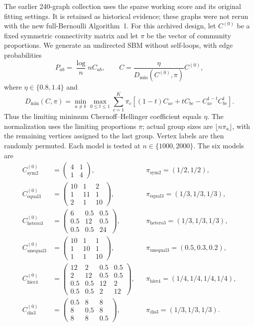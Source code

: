 \documentclass[11pt]{article}
\theoremstyle{definition}
\theoremstyle{remark}
\numberwithin{equation}{section}
\begin{document}
The earlier 240-graph collection uses the sparse working score and its original fitting settings. It is retained as historical evidence; these graphs were not rerun with the new full-Bernoulli Algorithm~1. For this archived design, let $C^{(0)}$ be a fixed symmetric connectivity matrix and
let $\pi$ be the vector of community proportions. We generate an undirected
SBM without self-loops, with edge probabilities
\begin{equation}
  P_{ab}=\frac\log n{n}C_{ab},\qquad
  C=\frac{\eta}{D_{\min}(C^{(0)},\pi)}C^{(0)},
  \label{eq:experiment_normalization}
\end{equation}
where $\eta\in\{0.8,1.4\}$ and
\begin{equation}
 D_{\min}(C,\pi)=\min_{a\ne b}\max_{0\le t\le1}
  \sum_{c=1}^K\pi_c\left[(1-t)C_{ac}+tC_{bc}
                          -C_{ac}^{1-t}C_{bc}^t\right].
\end{equation}
Thus the limiting minimum Chernoff--Hellinger coefficient equals $\eta$.
The normalization uses the limiting proportions $\pi$; actual group sizes
are $\lfloor n\pi_a\rfloor$, with the remaining vertices assigned to the
last group. Vertex labels are then randomly permuted. Each model is tested
at $n\in\{1000,2000\}$. The six models are
\begin{align*}
 C^{(0)}_{\mathrm{sym2}}&=
 \begin{pmatrix}4&1\\1&4\end{pmatrix},
 &&\pi_{\mathrm{sym2}}=(1/2,1/2),\\[2mm]
 C^{(0)}_{\mathrm{equal3}}&=
 \begin{pmatrix}10&1&2\\1&11&1\\2&1&10\end{pmatrix},
 &&\pi_{\mathrm{equal3}}=(1/3,1/3,1/3),\\[2mm]
 C^{(0)}_{\mathrm{hetero3}}&=
 \begin{pmatrix}6&0.5&0.5\\0.5&12&0.5\\0.5&0.5&24\end{pmatrix},
 &&\pi_{\mathrm{hetero3}}=(1/3,1/3,1/3),\\[2mm]
 C^{(0)}_{\mathrm{unequal3}}&=
 \begin{pmatrix}10&1&1\\1&10&1\\1&1&10\end{pmatrix},
 &&\pi_{\mathrm{unequal3}}=(0.5,0.3,0.2),\\[2mm]
 C^{(0)}_{\mathrm{hier4}}&=
 \begin{pmatrix}12&2&0.5&0.5\\2&12&0.5&0.5\\
                 0.5&0.5&12&2\\0.5&0.5&2&12\end{pmatrix},
 &&\pi_{\mathrm{hier4}}=(1/4,1/4,1/4,1/4),\\[2mm]
 C^{(0)}_{\mathrm{dis3}}&=
 \begin{pmatrix}0.5&8&8\\8&0.5&8\\8&8&0.5\end{pmatrix},
 &&\pi_{\mathrm{dis3}}=(1/3,1/3,1/3).
\end{align*}
\end{document}
